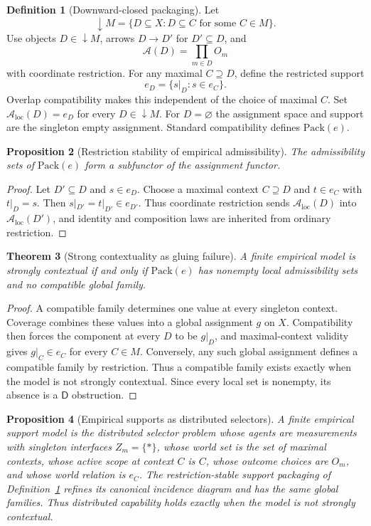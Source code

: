 \documentclass[11pt]{article}
\theoremstyle{plain}
\newtheorem{theorem}{Theorem}[section]
\newtheorem{proposition}[theorem]{Proposition}
\theoremstyle{definition}
\newtheorem{definition}[theorem]{Definition}
\theoremstyle{remark}
\newcommand{\LocalAdm}{\mathcal{A}_{\mathrm{loc}}}
\begin{document}
\begin{definition}[Downward-closed packaging]\label{def:packaging}
Let
\[
\downarrow M=\{D\subseteq X:D\subseteq C\text{ for some }C\in M\}.
\]
Use objects $D\in\downarrow M$, arrows $D\to D'$ for $D'\subseteq D$, and
\[
\mathcal A(D)=\prod_{m\in D}O_m
\]
with coordinate restriction. For any maximal $C\supseteq D$, define the
restricted support
\[
e_D=\{s|_D:s\in e_C\}.
\]
Overlap compatibility makes this independent of the choice of maximal $C$.
Set $\LocalAdm(D)=e_D$ for every $D\in\downarrow M$. For $D=\varnothing$ the
assignment space and support are the singleton empty assignment. Standard
compatibility defines $\mathrm{Pack}(e)$.
\end{definition}

\begin{proposition}[Restriction stability of empirical admissibility]\label{prop:empirical-subfunctor}
The admissibility sets of $\mathrm{Pack}(e)$ form a subfunctor of the assignment
functor.
\end{proposition}

\begin{proof}
Let $D'\subseteq D$ and $s\in e_D$. Choose a maximal context $C\supseteq D$ and
$t\in e_C$ with $t|_D=s$. Then
$s|_{D'}=t|_{D'}\in e_{D'}$. Thus coordinate restriction sends
$\LocalAdm(D)$ into $\LocalAdm(D')$, and identity and composition laws are
inherited from ordinary restriction.
\end{proof}

\begin{theorem}[Strong contextuality as gluing failure]\label{thm:KSfin}
A finite empirical model is strongly contextual if and only if
$\mathrm{Pack}(e)$ has nonempty local admissibility sets and no compatible
global family.
\end{theorem}

\begin{proof}
A compatible family determines one value at every singleton context. Coverage
combines these values into a global assignment $g$ on $X$. Compatibility then
forces the component at every $D$ to be $g|_D$, and maximal-context validity
gives $g|_C\in e_C$ for every $C\in M$. Conversely, any such global assignment
defines a compatible family by restriction. Thus a compatible family exists
exactly when the model is not strongly contextual. Since every local set is
nonempty, its absence is a $\mathsf D$ obstruction.
\end{proof}

\begin{proposition}[Empirical supports as distributed selectors]
\label{prop:empirical-distributed}
A finite empirical support model is the distributed selector problem whose
agents are measurements with singleton interfaces $Z_m=\{\ast\}$, whose world
set is the set of maximal contexts, whose active scope at context $C$ is $C$,
whose outcome choices are $O_m$, and whose
world relation is $e_C$. The restriction-stable support packaging of
Definition~\ref{def:packaging} refines its canonical incidence diagram and has
the same global families. Thus distributed capability holds exactly when the model
is not strongly contextual.
\end{proposition}
\end{document}
